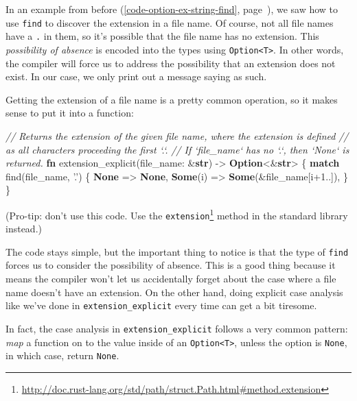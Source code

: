 \documentclass[a4paper,]{book}
\renewcommand*{\hyperref}[2][\ar]{%
  \def\ar{#2}%
  #2 (\autoref{#1}, page~\pageref{#1})}
\newenvironment{Shaded}{\begin{snugshade}}{\end{snugshade}}
\newcommand{\KeywordTok}[1]{\textcolor[rgb]{0.13,0.29,0.53}{\textbf{{#1}}}}
\newcommand{\DecValTok}[1]{\textcolor[rgb]{0.00,0.00,0.81}{{#1}}}
\newcommand{\CharTok}[1]{\textcolor[rgb]{0.31,0.60,0.02}{{#1}}}
\newcommand{\CommentTok}[1]{\textcolor[rgb]{0.56,0.35,0.01}{\textit{{#1}}}}
\newcommand{\NormalTok}[1]{{#1}}
\renewcommand{\href}[2]{#2\footnote{\url{#1}}}
\begin{document}
In an \hyperref[code-option-ex-string-find]{example from before}, we saw
how to use \texttt{find} to discover the extension in a file name. Of
course, not all file names have a \texttt{.} in them, so it's possible
that the file name has no extension. This \emph{possibility of absence}
is encoded into the types using
\texttt{Option\textless{}T\textgreater{}}. In other words, the compiler
will force us to address the possibility that an extension does not
exist. In our case, we only print out a message saying as such.

Getting the extension of a file name is a pretty common operation, so it
makes sense to put it into a function:

\begin{Shaded}
\begin{Highlighting}[]
\CommentTok{// Returns the extension of the given file name, where the extension is defined}
\CommentTok{// as all characters proceeding the first `.`.}
\CommentTok{// If `file_name` has no `.`, then `None` is returned.}
\KeywordTok{fn} \NormalTok{extension_explicit(file_name: &}\KeywordTok{str}\NormalTok{) -> }\KeywordTok{Option}\NormalTok{<&}\KeywordTok{str}\NormalTok{> \{}
    \KeywordTok{match} \NormalTok{find(file_name, }\CharTok{'.'}\NormalTok{) \{}
        \KeywordTok{None} \NormalTok{=> }\KeywordTok{None}\NormalTok{,}
        \KeywordTok{Some}\NormalTok{(i) => }\KeywordTok{Some}\NormalTok{(&file_name[i+}\DecValTok{1.}\NormalTok{.]),}
    \NormalTok{\}}
\NormalTok{\}}
\end{Highlighting}
\end{Shaded}

(Pro-tip: don't use this code. Use the
\href{http://doc.rust-lang.org/std/path/struct.Path.html\#method.extension}{\texttt{extension}}
method in the standard library instead.)

The code stays simple, but the important thing to notice is that the
type of \texttt{find} forces us to consider the possibility of absence.
This is a good thing because it means the compiler won't let us
accidentally forget about the case where a file name doesn't have an
extension. On the other hand, doing explicit case analysis like we've
done in \texttt{extension\_explicit} every time can get a bit tiresome.

In fact, the case analysis in \texttt{extension\_explicit} follows a
very common pattern: \emph{map} a function on to the value inside of an
\texttt{Option\textless{}T\textgreater{}}, unless the option is
\texttt{None}, in which case, return \texttt{None}.
\end{document}
